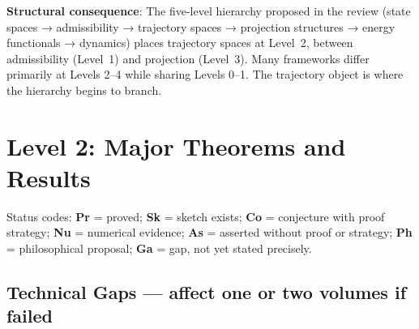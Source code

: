 \documentclass[11pt, a4paper]{article}
\begin{document}
\medskip
\begin{notebox}
\textbf{Structural consequence}: The five-level hierarchy proposed in
the review (state spaces → admissibility → trajectory spaces →
projection structures → energy functionals → dynamics) places trajectory
spaces at Level~2, between admissibility (Level~1) and projection
(Level~3). Many frameworks differ primarily at Levels 2--4 while
sharing Levels 0--1. The trajectory object is where the hierarchy begins
to branch.
\end{notebox}



\section{Level 2: Major Theorems and Results}

Status codes: \textbf{Pr} = proved; \textbf{Sk} = sketch exists;
\textbf{Co} = conjecture with proof strategy; \textbf{Nu} = numerical
evidence; \textbf{As} = asserted without proof or strategy;
\textbf{Ph} = philosophical proposal; \textbf{Ga} = gap, not yet
stated precisely.

\subsection{Technical Gaps --- affect one or two volumes if failed}
\end{document}
